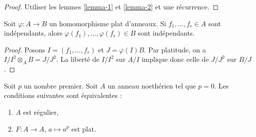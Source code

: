 \begin{proof}
Utiliser les lemmes \ref{lemma-1} et \ref{lemma-2} et une récurrence.
\end{proof}

\begin{lemma}
\label{lemma-flat-extension-independent}
Soit $\varphi : A \to B$ un homomorphisme plat d'anneaux. Si $f_1, \ldots, f_r \in A$ sont indépendants, alors $\varphi(f_1), \ldots, \varphi(f_r) \in B$ sont indépendants.
\end{lemma}

\begin{proof}
Posons $I = (f_1, \ldots, f_r)$ et $J = \varphi(I)B$. Par platitude, on a $I/I^2 \otimes_A B = J/J^2$. La liberté de $I/I^2$ sur $A/I$ implique donc celle de $J/J^2$ sur $B/J$.
\end{proof}

\begin{lemma}[Kunz]
\label{lemma-frobenius-flat-regular}
\begin{reference}
\cite{Kunz-flat}
\end{reference}
Soit $p$ un nombre premier. Soit $A$ un anneau noethérien tel que $p = 0$. Les conditions suivantes sont équivalentes :
\begin{enumerate}
\item $A$ est régulier,
\item $F : A \to A$, $a \mapsto a^p$ est plat.
\end{enumerate}
\end{lemma}

